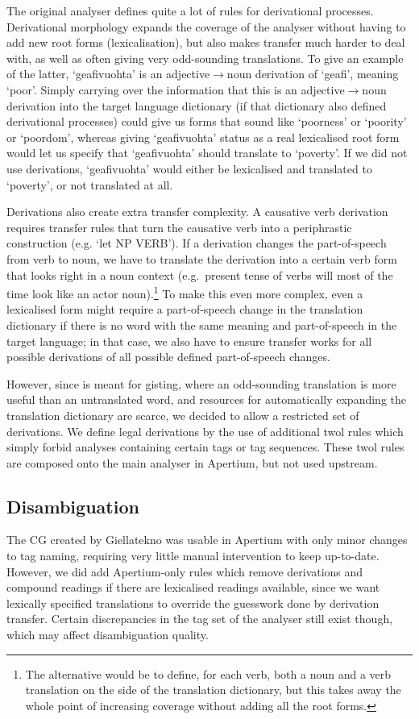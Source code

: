 \documentclass{book}
\begin{document}
The original analyser defines quite a lot of rules for derivational
processes. Derivational morphology expands the coverage of the
analyser without having to add new root forms (lexicalisation), but
also makes transfer much harder to deal with, as well as often giving
very odd-sounding translations.
To give an example of the latter, `geafivuohta' is an
adjective$\rightarrow{}$noun derivation of `geafi', meaning `poor'.
Simply carrying over the information that this is an
adjective$\rightarrow{}$noun derivation into the target language
dictionary (if that dictionary also defined derivational processes)
could give us forms that sound like `poorness' or `poority' or
`poordom', whereas giving `geafivuohta' status as a real lexicalised
root form would let us specify that `geafivuohta' should translate to
`poverty'. If we did not use derivations, `geafivuohta' would either
be lexicalised and translated to `poverty', or not translated at all.

Derivations also create extra transfer complexity. A causative verb
derivation requires transfer rules that turn the causative verb into a
periphrastic construction (e.g. `let NP VERB'). If a derivation
changes the part-of-speech from verb to noun, we have to translate the
derivation into a certain verb form that looks right in a noun context
(e.g.~present tense of \nob{} verbs will most of the time look like an
actor noun).\footnote{The alternative would be to define, for each
  \sme{} verb, both a noun and a verb translation on the \nob{} side
  of the translation dictionary, but this takes away the whole point
  of increasing coverage without adding all the root forms.} To make
this even more complex, even a lexicalised form might require a
part-of-speech change in the translation dictionary if there is no
word with the same meaning and part-of-speech in the target language;
in that case, we also have to ensure transfer works for all possible
derivations of all possible defined part-of-speech changes.

However, since \smenob{} is meant for gisting, where an odd-sounding
translation is more useful than an untranslated word, and resources
for automatically expanding the translation dictionary are scarce, we
decided to allow a restricted set of derivations. We define legal
derivations by the use of additional twol rules which simply forbid
analyses containing certain tags or tag sequences. These twol rules
are composed onto the main analyser in Apertium, but not used
upstream.

\subsection{Disambiguation}
The CG created by Giellatekno was usable in Apertium with only minor
changes to tag naming, requiring very little manual intervention to
keep up-to-date. However, we did add Apertium-only rules which remove
derivations and compound readings if there are lexicalised readings
available, since we want lexically specified translations to override
the guesswork done by derivation transfer. Certain discrepancies in
the tag set of the analyser still exist though, which may affect
disambiguation quality.
\end{document}
